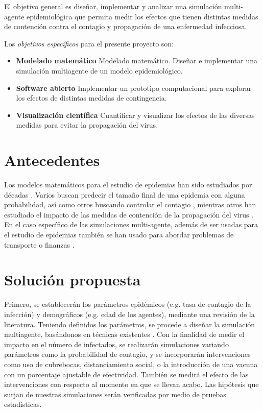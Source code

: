 \documentclass[a4]{sciposter}
\begin{document}
\begin{multicols}{2}
El objetivo general es diseñar, implementar y analizar una simulación multi-agente epidemiológica que permita medir los efectos que tienen distintas medidas de contención contra el contagio y propagación de una enfermedad infecciosa.\par
Los \emph{objetivos específicos} para el presente proyecto son:\par
\begin{itemize}
  \item \textbf{Modelado matemático} Modelado matemático. Diseñar e implementar una simulación multiagente de un modelo epidemiológico.
  \item \textbf{Software abierto} Implementar un prototipo computacional para explorar los efectos de distintas medidas de contingencia.
  \item \textbf{Visualización científica} Cuantificar y visualizar los efectos de las diversas medidas para evitar la propagación del virus.
\end{itemize}

\section{Antecedentes}
Los modelos matemáticos para el estudio de epidemias han sido estudiados por décadas \cite{Britton}. Varios buscan predecir el tamaño final de una epidemia con alguna probabilidad, así como otros buscando controlar el contagio \cite{contagio}, mientras otros han estudiado el impacto de las medidas de contención de la propagación del virus \cite{virus}. En el caso específico de las simulaciones multi-agente, además de ser usadas para el estudio de epidemias \cite{epidemias} también se han usado para abordar problemas de transporte \cite{transporte} o finanzas \cite{finanzas}. 



\section{Solución propuesta}

Primero, se establecerán los parámetros epidémicos (e.g. tasa de contagio de la infección) y demográficos (e.g. edad de los agentes), mediante una revisión de la literatura. Teniendo definidos los parámetros, se procede a diseñar la simulación multiagente, basándonos en técnicas existentes \cite{transporte}. Con la finalidad de medir el impacto en el número de infectados, se realizarán simulaciones variando parámetros como la probabilidad
de contagio, y se incorporarán intervenciones como uso de cubrebocas, distanciamiento social, o la introducción de una vacuna con un porcentaje ajustable de efectividad. También se medirá el efecto de las intervenciones con respecto al momento en que se llevan acabo. Las hipótesis que surjan de nuestras simulaciones serán verificadas por medio de pruebas estadísticas.


\end{multicols}
\end{document}
